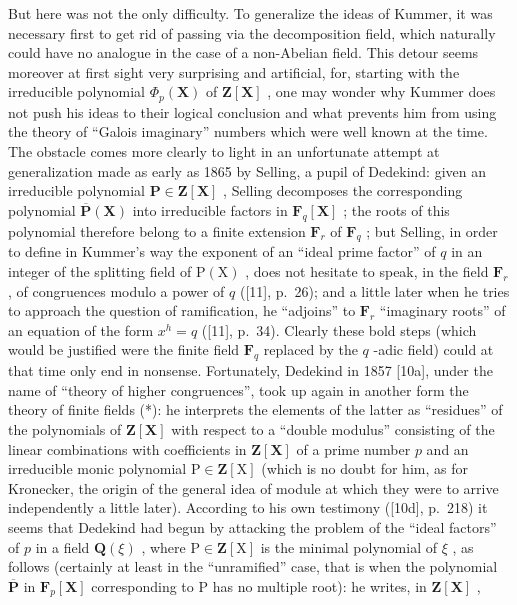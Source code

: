 But here was not the only difficulty. To generalize the ideas of Kummer, it was necessary first to get rid of passing via the decomposition field, which naturally could have no analogue in the case of a non-Abelian field. This detour seems moreover at first sight very surprising and artificial, for, starting with the irreducible polynomial \(\Phi_p(\mathbf{X})\) of \(\mathbf{Z}[\mathbf{X}]\) , one may wonder why Kummer does not push his ideas to their logical conclusion and what prevents him from using the theory of ``Galois imaginary'' numbers which were well known at the time. The obstacle comes more clearly to light in an unfortunate attempt at generalization made as early as 1865 by Selling, a pupil of Dedekind: given an irreducible polynomial \(\mathbf{P} \in \mathbf{Z}[\mathbf{X}]\) , Selling decomposes the corresponding polynomial \(\overline{\mathbf{P}}(\mathbf{X})\) into irreducible factors in \(\mathbf{F}_q[\mathbf{X}]\) ; the roots of this polynomial therefore belong to a finite extension \(\mathbf{F}_r\) of \(\mathbf{F}_q\) ; but Selling, in order to define in Kummer's way the exponent of an ``ideal prime factor'' of \(q\) in an integer of the splitting field of \(\mathrm{P}(\mathrm{X})\) , does not hesitate to speak, in the field \(\mathbf{F}_r\) , of congruences modulo a power of \(q\) ({[}11{]}, p.~26); and a little later when he tries to approach the question of ramification, he ``adjoins'' to \(\mathbf{F}_r\) ``imaginary roots'' of an equation of the form \(x^h = q\) ({[}11{]}, p.~34). Clearly these bold steps (which would be justified were the finite field \(\mathbf{F}_q\) replaced by the \(q\) -adic field) could at that time only end in nonsense. Fortunately, Dedekind in 1857 {[}10a{]}, under the name of ``theory of higher congruences'', took up again in another form the theory of finite fields (*): he interprets the elements of the latter as ``residues'' of the polynomials of \(\mathbf{Z}[\mathbf{X}]\) with respect to a ``double modulus'' consisting of the linear combinations with coefficients in \(\mathbf{Z}[\mathbf{X}]\) of a prime number \(p\) and an irreducible monic polynomial \(\mathrm{P} \in \mathbf{Z}[\mathrm{X}]\) (which is no doubt for him, as for Kronecker, the origin of the general idea of module at which they were to arrive independently a little later). According to his own testimony ({[}10d{]}, p.~218) it seems that Dedekind had begun by attacking the problem of the ``ideal factors'' of \(p\) in a field \(\mathbf{Q}(\xi)\) , where \(\mathrm{P} \in \mathbf{Z}[\mathrm{X}]\) is the minimal polynomial of \(\xi\) , as follows (certainly at least in the ``unramified'' case, that is when the polynomial \(\overline{\mathbf{P}}\) in \(\mathbf{F}_p[\mathbf{X}]\) corresponding to \(\mathrm{P}\) has no multiple root): he writes, in \(\mathbf{Z}[\mathbf{X}]\) ,

